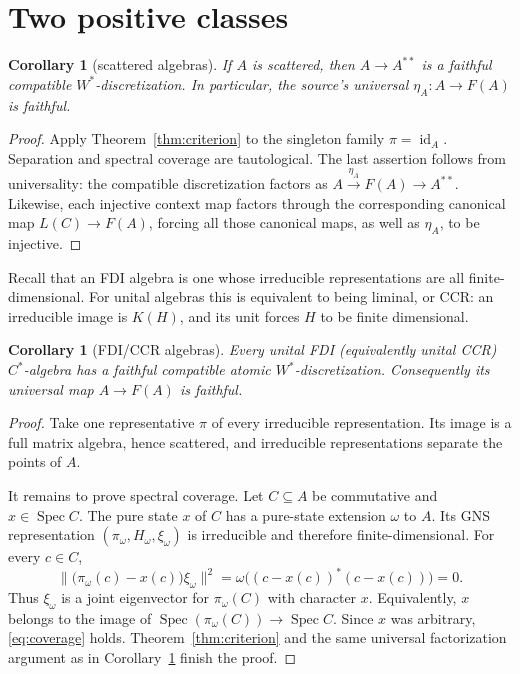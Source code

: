 \documentclass[11pt]{article}
\newtheorem{corollary}[theorem]{Corollary}
\newcommand{\Spec}{\operatorname{Spec}}
\begin{document}
\section{Two positive classes}

\begin{corollary}[scattered algebras]\label{cor:scattered}
If $A$ is scattered, then $A\to A^{**}$ is a faithful compatible
$W^*$-discretization.  In particular, the source's universal
$\eta_A:A\to F(A)$ is faithful.
\end{corollary}

\begin{proof}
Apply Theorem~\ref{thm:criterion} to the singleton family
$\pi=\operatorname{id}_A$.  Separation and spectral coverage are tautological.
The last assertion follows from universality: the compatible discretization
factors as $A\xrightarrow{\eta_A}F(A)\to A^{**}$.  Likewise, each injective
context map factors through the corresponding canonical map
$L(C)\to F(A)$, forcing all those canonical maps, as well as $\eta_A$, to be
injective.
\end{proof}

Recall that an FDI algebra is one whose irreducible representations are all
finite-dimensional.  For unital algebras this is equivalent to being liminal,
or CCR: an irreducible image is $K(H)$, and its unit forces $H$ to be finite
dimensional.

\begin{corollary}[FDI/CCR algebras]\label{cor:fdi}
Every unital FDI (equivalently unital CCR) $C^*$-algebra has a faithful
compatible atomic $W^*$-discretization.  Consequently its universal map
$A\to F(A)$ is faithful.
\end{corollary}

\begin{proof}
Take one representative $\pi$ of every irreducible representation.  Its image
is a full matrix algebra, hence scattered, and irreducible representations
separate the points of $A$.

It remains to prove spectral coverage.  Let $C\subseteq A$ be commutative and
$x\in\Spec C$.  The pure state $x$ of $C$ has a pure-state extension $\omega$
to $A$.  Its GNS representation $(\pi_\omega,H_\omega,\xi_\omega)$ is
irreducible and therefore finite-dimensional.  For every $c\in C$,
\[
 \|\bigl(\pi_\omega(c)-x(c)\bigr)\xi_\omega\|^2
 =\omega\bigl((c-x(c))^*(c-x(c))\bigr)=0.
\]
Thus $\xi_\omega$ is a joint eigenvector for $\pi_\omega(C)$ with character
$x$.  Equivalently, $x$ belongs to the image of
$\Spec(\pi_\omega(C))\to\Spec C$.  Since $x$ was arbitrary,
\eqref{eq:coverage} holds.  Theorem~\ref{thm:criterion} and the same universal
factorization argument as in Corollary~\ref{cor:scattered} finish the proof.
\end{proof}
\end{document}

